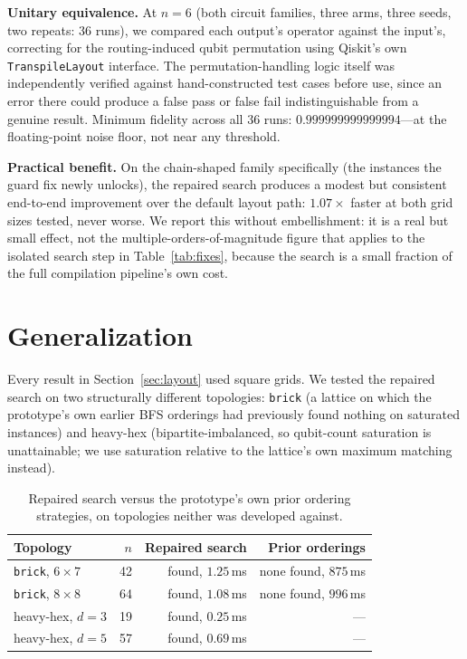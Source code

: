 \documentclass[11pt]{article}
\begin{document}
\textbf{Unitary equivalence.} At $n=6$ (both circuit families, three
arms, three seeds, two repeats: 36 runs), we compared each output's
operator against the input's, correcting for the routing-induced qubit
permutation using Qiskit's own \texttt{TranspileLayout} interface. The
permutation-handling logic itself was independently verified against
hand-constructed test cases before use, since an error there could
produce a false pass or false fail indistinguishable from a genuine
result. Minimum fidelity across all 36 runs: $0.999999999999994$---at
the floating-point noise floor, not near any threshold.

\textbf{Practical benefit.} On the chain-shaped family specifically
(the instances the guard fix newly unlocks), the repaired search
produces a modest but consistent end-to-end improvement over the
default layout path: $1.07\times$ faster at both grid sizes tested,
never worse. We report this without embellishment: it is a real but
small effect, not the multiple-orders-of-magnitude figure that applies
to the isolated search step in Table~\ref{tab:fixes}, because the
search is a small fraction of the full compilation pipeline's own cost.

\section{Generalization}
\label{sec:generalization}

Every result in Section~\ref{sec:layout} used square grids. We tested
the repaired search on two structurally different topologies:
\texttt{brick} (a lattice on which the prototype's own earlier BFS
orderings had previously found nothing on saturated instances) and
heavy-hex (bipartite-imbalanced, so qubit-count saturation is
unattainable; we use saturation relative to the lattice's own maximum
matching instead).

\begin{table}[h]
\centering
\begin{tabular}{lrrr}
\toprule
Topology & $n$ & Repaired search & Prior orderings \\
\midrule
\texttt{brick}, $6\times7$ & 42 & found, $1.25$\,ms & none found, $875$\,ms \\
\texttt{brick}, $8\times8$ & 64 & found, $1.08$\,ms & none found, $996$\,ms \\
heavy-hex, $d{=}3$ & 19 & found, $0.25$\,ms & --- \\
heavy-hex, $d{=}5$ & 57 & found, $0.69$\,ms & --- \\
\bottomrule
\end{tabular}
\caption{Repaired search versus the prototype's own prior ordering
strategies, on topologies neither was developed against.}
\label{tab:generalization}
\end{table}
\end{document}
